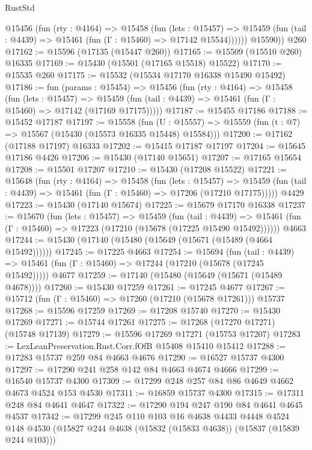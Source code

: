 \begin{lexlean}{RustStd}
\begin{coremodule}
          @15456
            (fun (rty : @4164) =>
            @15458
              (fun (lets : @15457) =>
              @15459 (fun (tail : @4439) => @15461 (fun (Γ : @15460) => @17142 @15544))))))
        @15590))
    @260
@17162 := @15596 (@17135 (@15447 @260))
@17165 := @15509 (@15510 @260) @16335
@17169 := @15430 (@15501 (@17165 @15518) @15522)
@17170 := @15535 @260
@17175 := @15532 (@15534 @17170 @16338 @15490 @15492)
@17186 := fun (params : @15454) =>
  @15456
    (fun (rty : @4164) =>
    @15458
      (fun (lets : @15457) =>
      @15459 (fun (tail : @4439) => @15461 (fun (Γ : @15460) => @17142 (@17169 @17175)))))
@17187 := @15455 @17186
@17188 := @15452 @17187
@17197 := @15558
    (fun (U : @15557) => @15559 (fun (t : @7) => @15567 (@15430 (@15573 @16335 @15448) @15584)))
@17200 := @17162 (@17188 @17197) @16333
@17202 := @15415 @17187 @17197
@17204 := @15645 @17186 @4426
@17206 := @15430 (@17140 @15651)
@17207 := @17165 @15654
@17208 := @15501 @17207
@17210 := @15430 (@17208 @15522)
@17221 := @15648
    (fun (rty : @4164) =>
    @15458
      (fun (lets : @15457) =>
      @15459 (fun (tail : @4439) => @15461 (fun (Γ : @15460) => @17206 (@17210 @17175)))))
    @4429
@17223 := @15430 (@17140 @15674)
@17225 := @15679 @17170 @16338
@17237 := @15670
    (fun (lets : @15457) =>
    @15459
      (fun (tail : @4439) =>
      @15461 (fun (Γ : @15460) => @17223 (@17210 (@15678 (@17225 @15490 @15492))))))
    @4663
@17244 := @15430 (@17140 (@15480 (@15649 (@15671 (@15489 (@4664 @15492))))))
@17245 := @17225 @4663
@17254 := @15694
    (fun (tail : @4439) => @15461 (fun (Γ : @15460) => @17244 (@17210 (@15678 (@17245 @15492)))))
    @4677
@17259 := @17140 (@15480 (@15649 (@15671 (@15489 @4678))))
@17260 := @15430 @17259
@17261 := @17245 @4677
@17267 := @15712 (fun (Γ : @15460) => @17260 (@17210 (@15678 @17261))) @15737
@17268 := @15596 @17259
@17269 := @17208 @15740
@17270 := @15430 @17269
@17271 := @15744 @17261
@17275 := @17268 (@17270 @17271) (@15748 @17139)
@17279 := @15596 @17269 @17271 (@15753 @17207)
@17283 := LexLeanPreservation.Rust.Corr.fOfB @15408 @15410 @15412
@17288 := @17283 @15737 @259 @84 @4663 @4676
@17290 := @16527 @15737 @4300
@17297 := @17290 @241 @258 @142 @84 @4663 @4674 @4666
@17299 := @16540 @15737 @4300
@17309 := @17299 @248 @257 @84 @86 @4649 @4662 @4673 @4524 @153 @4530
@17311 := @16859 @15737 @4300
@17315 := @17311 @248 @84 @4641 @4647
@17322 := @17290 @194 @247 @190 @84 @4641 @4645 @4537
@17342 := @17299
    @245
    @110
    @103
    @16
    @4638
    @4433
    @4448
    @4524
    @148
    @4530
    (@15827 @244 @4638 (@15832 (@15833 @4638)) (@15837 (@15839 @244 @103)))

\end{coremodule}
\end{lexlean}
